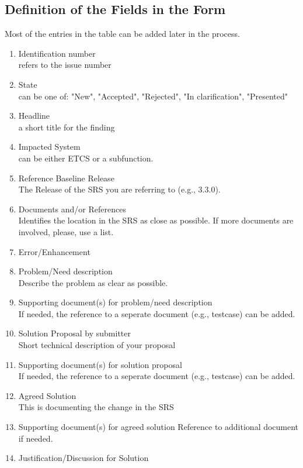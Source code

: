 \documentclass{template/openetcs_article}
\begin{document}
\subsection{Definition of the Fields in the Form}
Most of the entries in the table can be added later in the process.

\begin{enumerate}

\item Identification number\\
refers to the issue number
\item State\\
can be one of: "New", "Accepted", "Rejected", "In clarification", "Presented"
\item Headline\\
a short title for the finding
\item Impacted System\\
can be either ETCS or a subfunction.
\item Reference Baseline Release\\
The Release of the SRS you are referring to (e.g., 3.3.0).
\item Documents and/or References \\
Identifies the location in the SRS as close as possible. If more documents are involved, please, use a list.
\item Error/Enhancement\\
\item Problem/Need description\\
Describe the problem as clear as possible.
\item Supporting document(s) for problem/need description\\
 If needed, the reference to a seperate document (e.g., testcase) can be added.
\item Solution Proposal by submitter\\
Short technical description of your proposal
\item Supporting document(s) for solution proposal\\
If needed, the reference to a seperate document (e.g., testcase) can be added.
\item Agreed Solution\\
This is documenting the change in the SRS
\item Supporting document(s) for agreed solution
Reference to additional document if needed.
\item Justification/Discussion for Solution\\

\end{enumerate}
\end{document}
